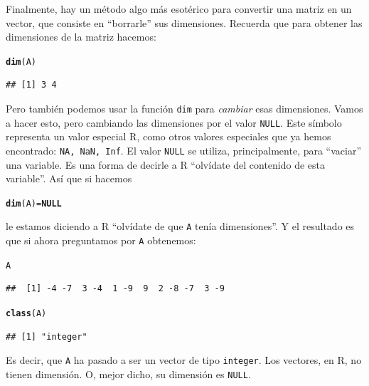 \documentclass[10pt,a4paper]{article}\usepackage[]{graphicx}\usepackage[]{color}
\makeatletter
\newcommand{\hlstd}[1]{\textcolor[rgb]{0.345,0.345,0.345}{#1}}%
\newcommand{\hlkwa}[1]{\textcolor[rgb]{0.161,0.373,0.58}{\textbf{#1}}}%
\newcommand{\hlkwb}[1]{\textcolor[rgb]{0.69,0.353,0.396}{#1}}%
\newcommand{\hlkwd}[1]{\textcolor[rgb]{0.737,0.353,0.396}{\textbf{#1}}}%
\newenvironment{kframe}{%
 \def\at@end@of@kframe{}%
 \ifinner\ifhmode%
  \def\at@end@of@kframe{\end{minipage}}%
  \begin{minipage}{\columnwidth}%
 \fi\fi%
 \def\FrameCommand##1{\hskip\@totalleftmargin \hskip-\fboxsep
 \colorbox{shadecolor}{##1}\hskip-\fboxsep
     \hskip-\linewidth \hskip-\@totalleftmargin \hskip\columnwidth}%
 \MakeFramed {\advance\hsize-\width
   \@totalleftmargin\z@ \linewidth\hsize
   \@setminipage}}%
 {\par\unskip\endMakeFramed%
 \at@end@of@kframe}
\newenvironment{knitrout}{}{} %
\newcounter {cont01}
\makeatother
\begin{document}
Finalmente, hay un método algo más esotérico para convertir una matriz en un vector, que consiste en ``borrarle'' sus dimensiones. Recuerda que para obtener las dimensiones de la matriz hacemos:
\begin{knitrout}
\color{fgcolor}\begin{kframe}
\begin{alltt}
    \hlkwd{dim}\hlstd{(A)}
\end{alltt}
\begin{verbatim}
## [1] 3 4
\end{verbatim}
\end{kframe}
\end{knitrout}
Pero también podemos usar la función {\tt dim} para {\em cambiar} esas dimensiones. Vamos a hacer esto, pero cambiando las dimensiones por el valor {\tt NULL}. Este símbolo representa un valor especial R, como otros valores especiales que ya hemos encontrado: {\tt NA, NaN, Inf}. El valor {\tt NULL} se utiliza, principalmente, para ``vaciar'' una variable. Es una forma de decirle a R ``olvídate del contenido de esta variable''. Así que si hacemos
\begin{knitrout}
\color{fgcolor}\begin{kframe}
\begin{alltt}
    \hlkwd{dim}\hlstd{(A)} \hlkwb{=} \hlkwa{NULL}
\end{alltt}
\end{kframe}
\end{knitrout}
le estamos diciendo a R ``olvídate de que {\tt A} tenía dimensiones''. Y el resultado es que si ahora preguntamos por {\tt A} obtenemos:
\begin{knitrout}
\color{fgcolor}\begin{kframe}
\begin{alltt}
    \hlstd{A}
\end{alltt}
\begin{verbatim}
##  [1] -4 -7  3 -4  1 -9  9  2 -8 -7  3 -9
\end{verbatim}
\begin{alltt}
    \hlkwd{class}\hlstd{(A)}
\end{alltt}
\begin{verbatim}
## [1] "integer"
\end{verbatim}
\end{kframe}
\end{knitrout}
Es decir, que {\tt A} ha pasado a ser un vector de tipo {\tt integer}. Los vectores, en R, no tienen dimensión. O,  mejor dicho, su dimensión es {\tt NULL}.
\end{document}
